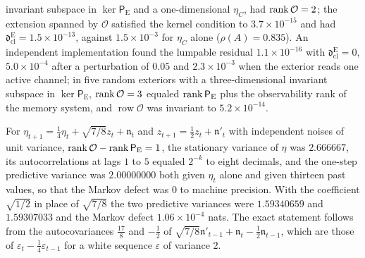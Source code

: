 \begin{numcheck}
invariant subspace in $\ker\mathsf P_{\mathrm E}$ and a one-dimensional $\eta_C$, had $\operatorname{rank}\mathcal O=2$; the extension spanned by $\mathcal O$ satisfied the kernel condition to $3.7\times10^{-15}$ and had $\mathfrak d^{\mathrm E}_{\mathrm{cl}}=1.5\times10^{-13}$, against $1.5\times10^{-3}$ for $\eta_C$ alone ($\rho(A)=0.835$). An independent implementation found the lumpable residual $1.1\times10^{-16}$ with $\mathfrak d^{\mathrm E}_{\mathrm{cl}}=0$, $5.0\times10^{-4}$ after a perturbation of $0.05$ and $2.3\times10^{-3}$ when the exterior reads one active channel; in five random exteriors with a three-dimensional invariant subspace in $\ker\mathsf P_{\mathrm E}$, $\operatorname{rank}\mathcal O=3$ equaled $\operatorname{rank}\mathsf P_{\mathrm E}$ plus the observability rank of the memory system, and $\operatorname{row}\mathcal O$ was invariant to $5.2\times10^{-14}$.
\end{numcheck}

\begin{numcheck}\label{chk:met-orders}
For $\eta_{t+1}=\frac14\eta_t+\sqrt{7/8}z_t+\mathfrak n_t$ and $z_{t+1}=\frac12z_t+\mathfrak n'_t$ with independent noises of unit variance, $\operatorname{rank}\mathcal O-\operatorname{rank}\mathsf P_{\mathrm E}=1$, the stationary variance of $\eta$ was $2.666667$, its autocorrelations at lags $1$ to $5$ equaled $2^{-k}$ to eight decimals, and the one-step predictive variance was $2.00000000$ both given $\eta_t$ alone and given thirteen past values, so that the Markov defect was $0$ to machine precision. With the coefficient $\sqrt{1/2}$ in place of $\sqrt{7/8}$ the two predictive variances were $1.59340659$ and $1.59307033$ and the Markov defect $1.06\times10^{-4}$ nats. The exact statement follows from the autocovariances $\frac{17}{8}$ and $-\frac12$ of $\sqrt{7/8}\mathfrak n'_{t-1}+\mathfrak n_t-\frac12\mathfrak n_{t-1}$, which are those of $\varepsilon_t-\frac14\varepsilon_{t-1}$ for a white sequence $\varepsilon$ of variance $2$.
\end{numcheck}

